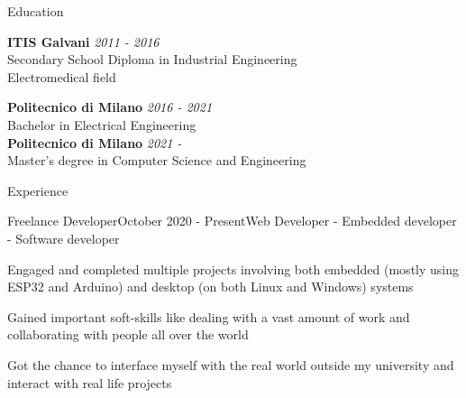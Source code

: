 \documentclass{resume} %
\begin{document}

\begin{rSection}{Education}

  {\bf ITIS Galvani} \hfill {\em 2011 - 2016} \\
  Secondary School Diploma in Industrial Engineering \smallskip \\
  Electromedical field

  {\bf Politecnico di Milano} \hfill {\em 2016 - 2021} \\
  Bachelor in Electrical Engineering \\

  {\bf Politecnico di Milano} \hfill {\em 2021 - } \\
  Master's degree in Computer Science and Engineering \\

\end{rSection}


\begin{rSection}{Experience}

  \begin{rSubsection}{Freelance Developer}{October 2020 - Present}{Web Developer - Embedded developer - Software developer}

    \item Engaged and completed multiple projects involving both embedded (mostly using ESP32 and Arduino) and desktop (on both Linux and Windows) systems
    \item Gained important soft-skills like dealing with a vast amount of work and collaborating with people all over the world
    \item Got the chance to interface myself with the real world outside my university and interact with real life projects

  \end{rSubsection}

\end{rSection}

\end{document}
